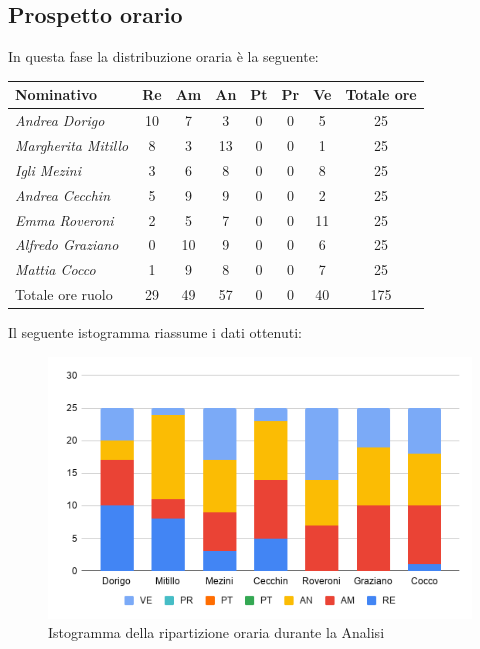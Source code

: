 \subsection{Prospetto orario}\label{PreventivoFaseDiAnalisiProspettoOrario}
In questa fase la distribuzione oraria è la seguente:
\quad
\def\tabularxcolumn#1{m{#1}}
{

	\begin{center}
		\renewcommand{\arraystretch}{1.4}
		\begin{tabularx}{\textwidth}{|X|c|c|c|c|c|c|c|}
			\hline
			\rowcolor{airforceblue}
			\textbf{Nominativo} & \textbf{Re} & \textbf{Am} & \textbf{An} & \textbf{Pt} & \textbf{Pr} & \textbf{Ve} & \textbf{Totale ore}\\
			\hline
			\textit{Andrea Dorigo} & 10 & 7 & 3 & 0 & 0 & 5 & 25\\
			\hline
			\textit{Margherita Mitillo} & 8 & 3 & 13 & 0 & 0 & 1 & 25\\
			\hline
			\textit{Igli Mezini} & 3 & 6 & 8 & 0 & 0 & 8 & 25\\
			\hline
			\textit{Andrea Cecchin} & 5 & 9 & 9 & 0 & 0 & 2 & 25\\
			\hline
			\textit{Emma Roveroni} & 2 & 5 & 7 & 0 & 0 & 11 & 25\\
			\hline
			\textit{Alfredo Graziano} & 0 & 10 & 9 & 0 & 0 & 6 & 25\\
			\hline
			\textit{Mattia Cocco} & 1 & 9 & 8 & 0 & 0 & 7 & 25\\
			\hline
			Totale ore ruolo & 29 & 49 & 57 & 0 & 0 & 40 & 175\\
			\hline
		\end{tabularx}
	\end{center}

Il seguente istogramma riassume i dati ottenuti:
\begin{figure}[!h]
	\begin{center}
		\includegraphics[width=0.7\linewidth]{../immagini/pdp/istogramma_analisi.png}
		\caption{Istogramma della ripartizione oraria durante la Analisi}
	\end{center}
\end{figure}
\clearpage
}
